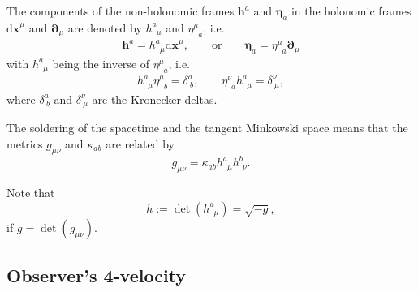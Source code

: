 \documentclass[
10pt, %
a4paper, %
oneside, %
twocolumn,
headinclude,footinclude, %
BCOR5mm, %
]{scrartcl}
\newcommand{\mg}[1]{\kappa_{#1}}			%
\newcommand{\pdd}[1]{{\bm{\partial}_{#1}}}
\newcommand{\dx}[1]{{\bm{\mathrm{d}x}^{#1}}}
\newcommand{\tetrsymbol}{h}
\newcommand{\itetrsymbol}{\eta}
\newcommand{\itetr}[2]{\itetrsymbol^{#1}_{\phantom{#1}#2}}
\newcommand{\tetr}[2]{\tetrsymbol^{#1}_{\phantom{#1}#2}}
\newcommand{\detTetr}{\tetrsymbol}
\newcommand{\cobas}[1]{\bm{\tetrsymbol}^{#1}}
\newcommand{\bas}[1]{\bm{\itetrsymbol}_{#1}}
\newcommand{\KD}[2]{\delta^{#1}_{\ #2}}
\newcommand{\ho}[1]{\textcolor{magenta}{HO: #1}}
\begin{document}
	The components of the non-holonomic frames $ \cobas{a} $ and $ \bas{a} $ in the holonomic 
	frames $ \dx{\mu} $ and $ \pdd{\mu} $ are denoted by $ \tetr{a}{\mu} $ and $ \itetr{\mu}{a} $, 
	i.e. 
	\begin{equation}
		\cobas{a} = \tetr{a}{\mu}\dx{\mu}, \qquad \text{or} \qquad \bas{a} = \itetr{\mu}{a}\pdd{\mu}
	\end{equation}
	with $ \tetr{a}{\mu} $ being the inverse of $ \itetr{\mu}{a} $, i.e.
	\begin{equation}\label{eqn.inv.tetr}
		\tetr{a}{\mu} \itetr{\mu}{b} = \KD{a}{b},
		\qquad
		\itetr{\nu}{a}\tetr{a}{\mu}  = \KD{\nu}{\mu},
	\end{equation}
	where $ \KD{a}{b} $ and $ \KD{\nu}{\mu} $ are the Kronecker deltas.
	
	The soldering of the spacetime and the tangent Minkowski space means that the metrics $ 
	g_{\mu\nu} 
	$ and $ \mg{ab} $ are related by  
	\begin{equation}
		g_{\mu\nu} = \mg{ab} \tetr{a}{\mu}\tetr{b}{\nu}.
	\end{equation}
	
	
	Note that 
	\begin{equation}\label{eqn.det}
		\detTetr := \det(\tetr{a}{\mu}) = \sqrt{-g},
	\end{equation}
	if $ g = \det(g_{\mu\nu}) $.
	
	\subsection{Observer's 4-velocity}
	
\end{document}
